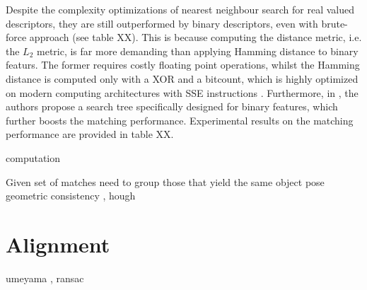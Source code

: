 Despite the complexity optimizations of nearest neighbour search for real valued descriptors, they are still outperformed by binary descriptors, even with brute-force approach (see table XX). This is because computing the distance metric, i.e. the $L_2$ metric, is far more demanding than applying Hamming distance to binary featurs. The former requires costly floating point operations, whilst the Hamming distance is computed only with a XOR and a bitcount, which is highly optimized on modern computing architectures with SSE instructions \cite{ORB}. Furthermore, in \cite{binaryFlann}, the authors propose a search tree specifically designed for binary features, which further boosts the matching performance. Experimental results on the matching performance are provided in table XX.

computation

Given set of matches need to group those that yield the same object pose
geometric consistency \cite{geometricConsistency}, hough \cite{hough}



\section{Alignment}
\label{sec:alignment}



umeyama \cite{umeyama}, ransac

